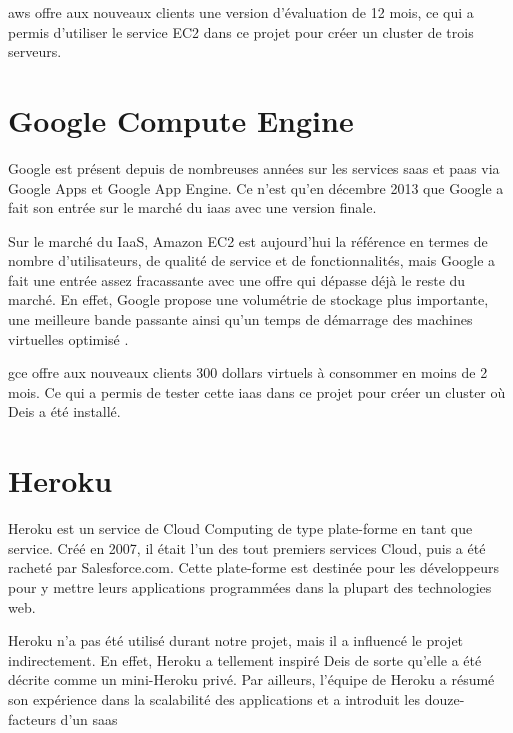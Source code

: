 \acrshort{aws} offre aux nouveaux clients une version d'évaluation de 12 mois, ce qui a permis d'utiliser le service EC2 dans ce projet pour créer un cluster de trois serveurs.

\section*{Google Compute Engine}

Google est présent depuis de nombreuses années sur les services \acrshort{saas} et \acrshort{paas} via Google Apps et Google App Engine. Ce n'est qu'en décembre 2013 que Google a fait son entrée sur le marché du \acrshort{iaas} avec une version finale.

Sur le marché du IaaS, Amazon EC2 est aujourd'hui la référence en termes de nombre d'utilisateurs, de qualité de service et de fonctionnalités, mais Google a fait une entrée assez fracassante avec une offre qui dépasse déjà le reste du marché. En effet, Google propose une volumétrie de stockage plus importante, une meilleure bande passante ainsi qu'un temps de démarrage des machines virtuelles optimisé \cite{gce}.

\acrshort{gce} offre aux nouveaux clients 300 dollars virtuels à consommer en moins de 2 mois. Ce qui a permis de tester cette \acrshort{iaas} dans ce projet pour créer un cluster où Deis a été installé.

\section*{Heroku}

Heroku est un service de Cloud Computing de type plate-forme en tant que service. Créé en 2007, il était l'un des tout premiers services Cloud, puis a été racheté par Salesforce.com. Cette plate-forme est destinée pour les développeurs pour y mettre leurs applications programmées dans la plupart des technologies web.

Heroku n'a pas été utilisé durant notre projet, mais il a influencé le projet indirectement. En effet, Heroku a tellement inspiré Deis de sorte qu'elle a été décrite comme un mini-Heroku privé. Par ailleurs, l'équipe de Heroku a résumé son expérience dans la scalabilité des applications et a introduit les douze-facteurs d'un \acrshort{saas}

